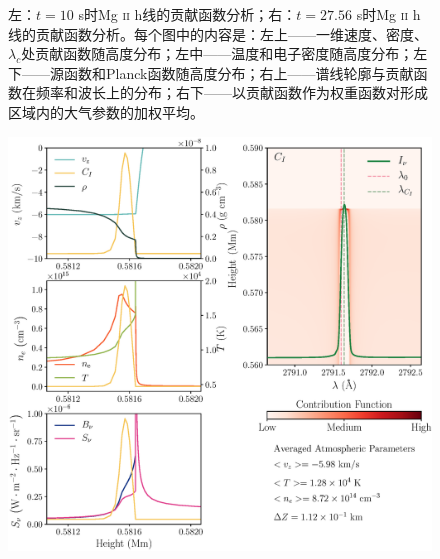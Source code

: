 \begin{figure}[htbp]
\begin{minipage}[t]{0.5\linewidth}
	\end{minipage}
	\caption{左：$t=10$ s时Mg \textsc{ii} h线的贡献函数分析；右：$t=27.56$ s时Mg \textsc{ii} h线的贡献函数分析。每个图中的内容是：左上——一维速度、密度、$\lambda_c$处贡献函数随高度分布；左中——温度和电子密度随高度分布；左下——源函数和Planck函数随高度分布；右上——谱线轮廓与贡献函数在频率和波长上的分布；右下——以贡献函数作为权重函数对形成区域内的大气参数的加权平均。}
	\label{fig:3.11}
\end{figure}

\begin{figure}[htbp]
	\begin{minipage}[t]{0.5\linewidth}
	\centering
	\includegraphics[width=\linewidth]{figs/ctb_5F11_250_lc_2}
	\end{minipage}%
	\hfill
	\begin{minipage}[t]{0.5\linewidth}
	\centering

\end{minipage}
\end{figure}
